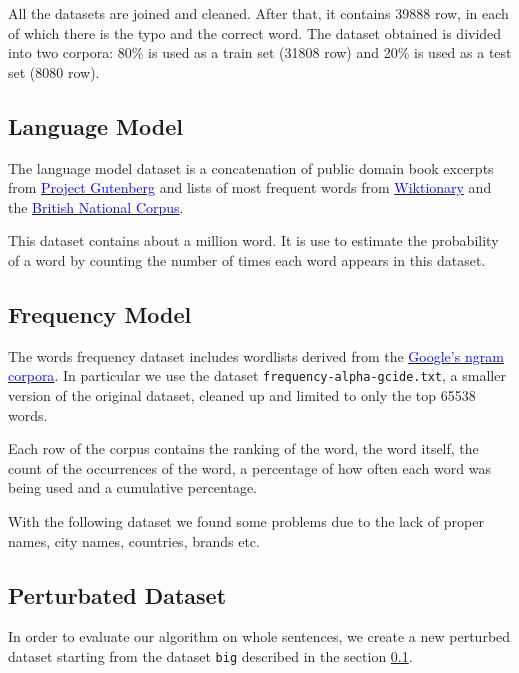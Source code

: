All the datasets are joined and cleaned. After that, it contains \num{39888} row, in each of which there 
is the typo and the correct word.
The dataset obtained is divided into two corpora: \num{80}\% is used as a train set (\num{31808} row) and \num{20}\% is 
used as a test set (\num{8080} row).

\subsection{Language Model}
\label{subsection:languagemodel}
The language model dataset is a concatenation of public domain book excerpts from 
\href{http://www.gutenberg.org/wiki/Main_Page}{ \textcolor{blue}{Project Gutenberg}}  and lists of most frequent words 
from \href{https://en.wiktionary.org/wiki/Wiktionary:Frequency_lists}{ \textcolor{blue}{Wiktionary}} and the 
\href{http://www.kilgarriff.co.uk/bnc-readme.html}{\textcolor{blue}{British National Corpus}}. 

This dataset contains about a million word. It is use to estimate the probability of a word by counting the number of times 
each word appears in this dataset. %

\subsection{Frequency Model}
The words frequency dataset includes wordlists derived from the \href{https://books.google.com/ngrams/}{ 
\textcolor{blue}{Google's ngram corpora}}. In particular we use the dataset \texttt{frequency-alpha-gcide.txt}, a smaller 
version of the original dataset, cleaned up and limited to only the top \num{65538} words.

Each row of the corpus contains the ranking of the word, the word itself, the count of the occurrences of the word, a 
percentage of how often each word was being used and a cumulative percentage.

With the following dataset we found some problems due to the lack of proper names, city names, countries, brands etc.

\subsection{Perturbated Dataset}
In order to evaluate our algorithm on whole sentences, we create a new perturbed dataset starting from the dataset 
\texttt{big} described in the section \ref{subsection:languagemodel}.

